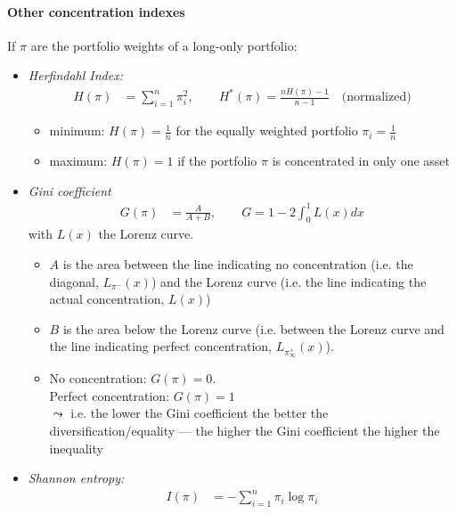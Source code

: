 \documentclass[a4paper,landscape,8pt,fleqn]{scrartcl}
\makeatletter
\renewcommand{\subsection}{\@startsection{subsection}{1}{0mm}%
{-2\baselineskip}{0.8\baselineskip}%
{\hrule depth 0.2pt width\columnwidth\hrule depth0.75pt
width0.25\columnwidth\vspace*{1.2em}\large\bfseries}}
\makeatother
\begin{document}
\begin{multicols*}{3}
\paragraph{Other concentration indexes}
If $\pi$ are the portfolio weights of a long-only portfolio:
\begin{itemize}
\item \textit{Herfindahl Index:}
\begin{align*}
H(\pi) &= \sum_{i=1}^n \pi_i^2, \qquad H^\ast(\pi) = \frac{n H(\pi) - 1}{n-1} \quad \text{(normalized)}
\end{align*}
\begin{itemize}
\item minimum: $H(\pi) = \frac{1}{n}$ for the equally weighted portfolio $\pi_i = \frac{1}{n}$
\item maximum: $H(\pi) = 1$ if the portfolio $\pi$ is concentrated in only one asset
\end{itemize}
\item \textit{Gini coefficient}
\begin{align*}
G(\pi) &= \frac{A}{A+B}, \qquad G = 1 - 2 \int_0^1 L(x) dx
\end{align*}
with $L(x)$ the Lorenz curve.
\begin{itemize}
\item $A$ is the area between the line indicating no concentration (i.e. the diagonal, $L_{\pi^-}(x)$) and the Lorenz curve (i.e. the line indicating the actual concentration, $L(x)$)
\item $B$ is the area below the Lorenz curve (i.e. between the Lorenz curve and the line indicating perfect concentration, $L_{\pi_\infty^+}(x)$).
\item No concentration: $G(\pi) = 0$. \\
Perfect concentration: $G(\pi) = 1$ \\
$\leadsto$ i.e. the lower the Gini coefficient the better the diversification/equality --- the higher the Gini coefficient the higher the inequality
\end{itemize}
\item \textit{Shannon entropy:}
\begin{align*}
I(\pi) &= - \sum_{i=1}^n \pi_i \log \pi_i
\end{align*}
\end{itemize}



\end{multicols*}
\end{document}
